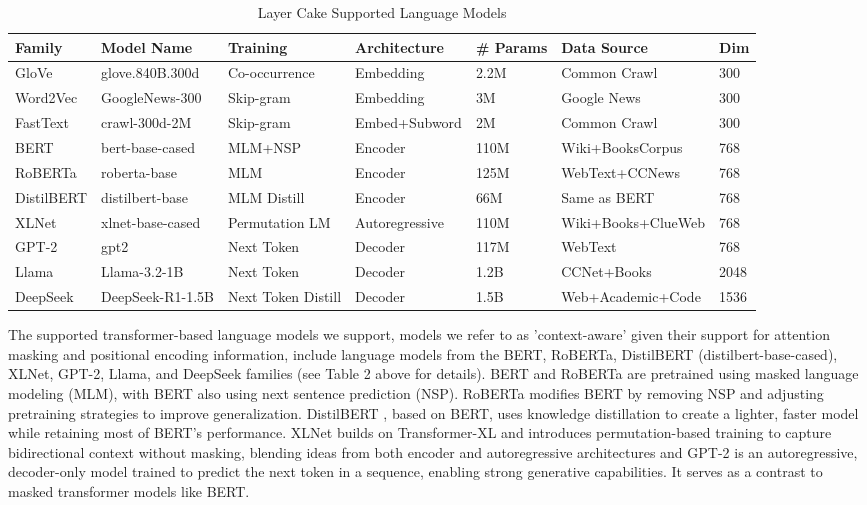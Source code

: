 \documentclass[final]{clv2025-revised}
\begin{document}
\begin{table}[h!]
\centering
\scriptsize
\caption{Layer Cake Supported Language Models}
\renewcommand{\arraystretch}{1.1}
\begin{tabular}{@{}p{1.2cm} p{2cm} p{1.8cm} p{1.7cm} p{1.2cm} p{2.2cm} p{0.7cm}@{}}
\toprule
\textbf{Family} & \textbf{Model Name} & \textbf{Training} & \textbf{Architecture} & \textbf{\# Params} & \textbf{Data Source} & \textbf{Dim} \\
\midrule
GloVe & glove.840B.300d & Co-occurrence & Embedding & 2.2M & Common Crawl & 300 \\
Word2Vec & GoogleNews-300 & Skip-gram & Embedding & 3M & Google News & 300 \\
FastText & crawl-300d-2M & Skip-gram & Embed+Subword & 2M & Common Crawl & 300 \\
\midrule
BERT & bert-base-cased & MLM+NSP & Encoder & 110M & Wiki+BooksCorpus & 768 \\
RoBERTa & roberta-base & MLM & Encoder & 125M & WebText+CCNews & 768 \\
DistilBERT & distilbert-base & MLM Distill & Encoder & 66M & Same as BERT & 768 \\
XLNet & xlnet-base-cased & Permutation LM & Autoregressive & 110M & Wiki+Books+ClueWeb & 768 \\
GPT-2 & gpt2 & Next Token & Decoder & 117M & WebText & 768 \\
Llama & Llama-3.2-1B & Next Token & Decoder & 1.2B & CCNet+Books & 2048 \\
DeepSeek & DeepSeek-R1-1.5B & Next Token Distill & Decoder & 1.5B & Web+Academic+Code & 1536 \\
\bottomrule
\end{tabular}
\end{table}

The supported transformer-based language models we support, models we refer to as 'context-aware' given their support for attention masking and positional encoding information, include language models from the BERT, RoBERTa, DistilBERT (distilbert-base-cased), XLNet, GPT-2, Llama, and DeepSeek families (see Table 2 above for details). BERT \cite{devlin-etal-2019-bert} and RoBERTa \cite{liu2019roberta} are pretrained using masked language modeling (MLM), with BERT also using next sentence prediction (NSP). RoBERTa modifies BERT by removing NSP and adjusting pretraining strategies to improve generalization. DistilBERT \cite{sanh2020distilbert}, based on BERT, uses knowledge distillation \cite{hinton2015distilling} to create a lighter, faster model while retaining most of BERT's performance. XLNet \cite{yang2019xlnet} builds on Transformer-XL \cite{dai2019transformer} and introduces permutation-based training to capture bidirectional context without masking, blending ideas from both encoder and autoregressive architectures and GPT-2 \cite{radford2019language} is an autoregressive, decoder-only model trained to predict the next token in a sequence, enabling strong generative capabilities. It serves as a contrast to masked transformer models like BERT. 
\end{document}
